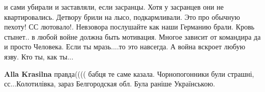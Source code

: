 \begin{itemize}
\begin{itemize}
и сами убирали и заставляли, если засранцы. Хотя у засранцев они не
квартировались. Детвору брили на лысо, подкармливали. Это про обычную пехоту!
СС лютовало!. Невзовора послушайте как наши Германию брали. Кровь стынет.. в
любой войне должна быть мотивация. Многое зависит от командира да и просто
Человека. Если ты мразь....то это навсегда. А война вскроет любую язву. Кто ты,
как ты...

\textbf{Alla Krasilna} правда(((( бабця те саме казала.
Чорнопогонники були страшні, сс...Колотилівка, зараз Белгородская обл. Була раніше Українською.


\end{itemize} %

\end{itemize} %
